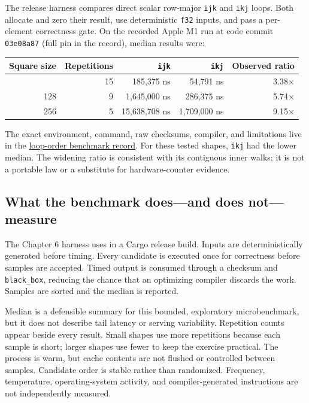 \documentclass[
  10pt,
]{article}
\newcounter{none} %
\begin{document}
The release harness compares direct scalar row-major \texttt{ijk} and
\texttt{ikj} loops. Both allocate and zero their result, use
deterministic \texttt{f32} inputs, and pass a per-element correctness
gate. On the recorded Apple M1 run at code commit \texttt{03e08a87}
(full pin in the record), median results were:

{\def\LTcaptype{none} %
\begin{longtable}[]{@{}rrrrr@{}}
\toprule\noalign{}
Square size & Repetitions & \texttt{ijk} & \texttt{ikj} & Observed
ratio \\
\midrule\noalign{}
\endhead
\bottomrule\noalign{}
\endlastfoot
64 & 15 & 185,375 ns & 54,791 ns & 3.38× \\
128 & 9 & 1,645,000 ns & 286,375 ns & 5.74× \\
256 & 5 & 15,638,708 ns & 1,709,000 ns & 9.15× \\
\end{longtable}
}

The exact environment, command, raw checksums, compiler, and limitations
live in the
\href{https://github.com/hermonai/inside-the-llm-engine/blob/astra-visual-rewrite/research/benchmarks/chapter-06-loop-order.md}{loop-order
benchmark record}. For these tested shapes, \texttt{ikj} had the lower
median. The widening ratio is consistent with its contiguous inner
walks; it is not a portable law or a substitute for hardware-counter
evidence.

\subsection{What the benchmark does---and does
not---measure}\label{what-the-benchmark-doesand-does-notmeasure}

The Chapter 6 harness uses \texttt{} in a
Cargo release build. Inputs are deterministically generated before
timing. Every candidate is executed once for correctness before samples
are accepted. Timed output is consumed through a checksum and
\texttt{black\_box}, reducing the chance that an optimizing compiler
discards the work. Samples are sorted and the median is reported.

Median is a defensible summary for this bounded, exploratory
microbenchmark, but it does not describe tail latency or serving
variability. Repetition counts appear beside every result. Small shapes
use more repetitions because each sample is short; larger shapes use
fewer to keep the exercise practical. The process is warm, but cache
contents are not flushed or controlled between samples. Candidate order
is stable rather than randomized. Frequency, temperature,
operating-system activity, and compiler-generated instructions are not
independently measured.
\end{document}
